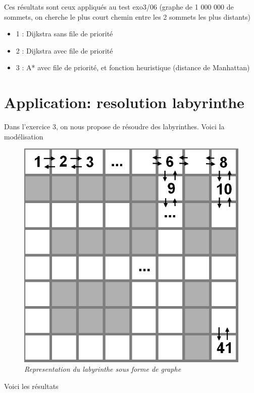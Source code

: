 \documentclass[10pt]{article}
\begin{document}
			Ces résultats sont ceux appliqués au test exo3/06\newline
			(graphe de 1 000 000 de sommets, on cherche le plus court chemin entre les 2 sommets les plus distants)
			
			\begin{itemize}[label=-]
				\item 1 : Dijkstra sans file de priorité
				\item 2 : Dijkstra avec file de priorité
				\item 3 : A* avec file de priorité, et fonction heuristique (distance de Manhattan)
			\end{itemize}
			
	\newpage
	\section{Application: resolution labyrinthe}
		Dans l'exercice 3, on nous propose de résoudre des labyrinthes.
		Voici la modélisation
		\begin{figure}
			\begin{center}
				\includegraphics[width=12cm,height=\textheight,keepaspectratio]{./images/lab.png}
			\end{center}
			\caption{\textit{Representation du labyrinthe sous forme de graphe}}
		\end{figure}
		Voici les résultats 
\end{document}
